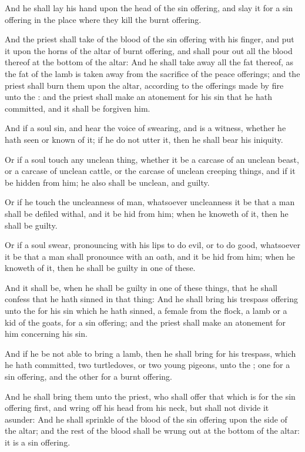 \Verse And he shall lay his hand upon the head of the sin offering, and slay it for a sin offering in the place where they kill the burnt offering.

\Verse And the priest shall take of the blood of the sin offering with his finger, and put it upon the horns of the altar of burnt offering, and shall pour out all the blood thereof at the bottom of the altar: \Verse And he shall take away all the fat thereof, as the fat of the lamb is taken away from the sacrifice of the peace offerings; and the priest shall burn them upon the altar, according to the offerings made by fire unto the \LORD: and the priest shall make an atonement for his sin that he hath committed, and it shall be forgiven him.

\Chapter
\Verse And if a soul sin, and hear the voice of swearing, and is a witness, whether he hath seen or known of it; if he do not utter it, then he shall bear his iniquity.

\Verse Or if a soul touch any unclean thing, whether it be a carcase of an unclean beast, or a carcase of unclean cattle, or the carcase of unclean creeping things, and if it be hidden from him; he also shall be unclean, and guilty.

\Verse Or if he touch the uncleanness of man, whatsoever uncleanness it be that a man shall be defiled withal, and it be hid from him; when he knoweth of it, then he shall be guilty.

\Verse Or if a soul swear, pronouncing with his lips to do evil, or to do good, whatsoever it be that a man shall pronounce with an oath, and it be hid from him; when he knoweth of it, then he shall be guilty in one of these.

\Verse And it shall be, when he shall be guilty in one of these things, that he shall confess that he hath sinned in that thing: \Verse And he shall bring his trespass offering unto the \LORD for his sin which he hath sinned, a female from the flock, a lamb or a kid of the goats, for a sin offering; and the priest shall make an atonement for him concerning his sin.

\Verse And if he be not able to bring a lamb, then he shall bring for his trespass, which he hath committed, two turtledoves, or two young pigeons, unto the \LORD; one for a sin offering, and the other for a burnt offering.

\Verse And he shall bring them unto the priest, who shall offer that which is for the sin offering first, and wring off his head from his neck, but shall not divide it asunder: \Verse And he shall sprinkle of the blood of the sin offering upon the side of the altar; and the rest of the blood shall be wrung out at the bottom of the altar: it is a sin offering.


